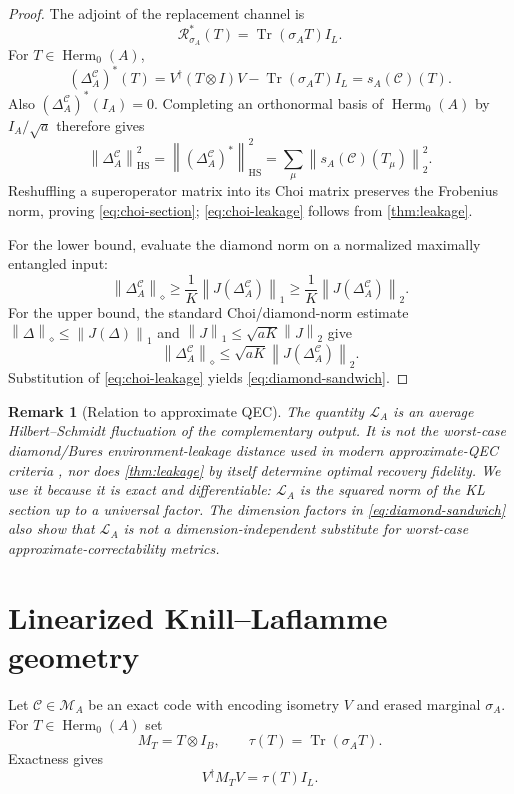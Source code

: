 \documentclass[11pt]{article}
\newtheorem{remark}[theorem]{Remark}
\theoremstyle{definition}
\newcommand{\cC}{\mathcal C}
\newcommand{\cM}{\mathcal M}
\newcommand{\cL}{\mathcal L}
\newcommand{\cR}{\mathcal R}
\newcommand{\Herm}{\operatorname{Herm}}
\newcommand{\Tr}{\operatorname{Tr}}
\newcommand{\1}{\mathbf 1}
\newcommand{\norm}[1]{\left\lVert #1\right\rVert}
\begin{document}
\begin{proof}
The adjoint of the replacement channel is
\[
\cR_{\sigma_A}^{*}(T)=\Tr(\sigma_A T)I_L.
\]
For $T\in\Herm_0(A)$,
\[
(\Delta_A^{\cC})^*(T)
=
V^\dagger(T\otimes I)V-\Tr(\sigma_AT)I_L
=
s_A(\cC)(T).
\]
Also $(\Delta_A^{\cC})^*(I_A)=0$.  Completing an orthonormal basis of $\Herm_0(A)$ by $I_A/\sqrt a$ therefore gives
\[
\norm{\Delta_A^{\cC}}_{\mathrm{HS}}^2
=
\norm{(\Delta_A^{\cC})^*}_{\mathrm{HS}}^2
=
\sum_\mu\norm{s_A(\cC)(T_\mu)}_2^2.
\]
Reshuffling a superoperator matrix into its Choi matrix preserves the Frobenius norm, proving \eqref{eq:choi-section}; \eqref{eq:choi-leakage} follows from \cref{thm:leakage}.

For the lower bound, evaluate the diamond norm on a normalized maximally entangled input:
\[
\norm{\Delta_A^{\cC}}_\diamond
\ge \frac1K\norm{J(\Delta_A^{\cC})}_1
\ge \frac1K\norm{J(\Delta_A^{\cC})}_2.
\]
For the upper bound, the standard Choi/diamond-norm estimate
$\norm{\Delta}_\diamond\le\norm{J(\Delta)}_1$ \cite{Watrous2009} and
$\norm{J}_1\le\sqrt{aK}\norm{J}_2$ give
\[
\norm{\Delta_A^{\cC}}_\diamond
\le\sqrt{aK}\norm{J(\Delta_A^{\cC})}_2.
\]
Substitution of \eqref{eq:choi-leakage} yields \eqref{eq:diamond-sandwich}.
\end{proof}

\begin{remark}[Relation to approximate QEC]
The quantity $\cL_A$ is an average Hilbert--Schmidt fluctuation of the complementary output.  It is not the worst-case diamond/Bures environment-leakage distance used in modern approximate-QEC criteria \cite{BenyOreshkov2009,ElimelechAlbertBarg2026}, nor does \cref{thm:leakage} by itself determine optimal recovery fidelity.  We use it because it is exact and differentiable: $\cL_A$ is the squared norm of the KL section up to a universal factor.  The dimension factors in \eqref{eq:diamond-sandwich} also show that $\cL_A$ is not a dimension-independent substitute for worst-case approximate-correctability metrics.
\end{remark}

\section{Linearized Knill--Laflamme geometry}
\label{sec:linearized}

Let $\cC\in\cM_A$ be an exact code with encoding isometry $V$ and erased marginal $\sigma_A$.  For $T\in\Herm_0(A)$ set
\[
M_T=T\otimes I_B,
\qquad
\tau(T)=\Tr(\sigma_A T).
\]
Exactness gives
\[
V^\dagger M_T V=\tau(T)I_L.
\]
\end{document}
